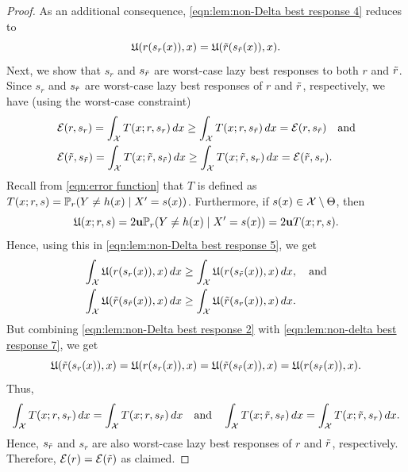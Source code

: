 \begin{proof}
    As an additional consequence, \eqref{eqn:lem:non-Delta best response 4} reduces to
    \begin{equation}\label{eqn:lem:non-delta best response 7}
        \mathfrak{U}(r(s_r(x)),x) = \mathfrak{U}(\tilde{r}(s_{\tilde{r}}(x)),x).
    \end{equation}
    Next, we show that $s_r$ and $s_{\tilde{r}}$ are worst-case lazy best responses to both $r$ and $\tilde{r}$. Since $s_r$ and $s_{\tilde{r}}$ are worst-case lazy best responses of $r$ and $\tilde{r}$, respectively, we have (using the worst-case constraint)
    \begin{equation}\label{eqn:lem:non-Delta best response 5}
        \begin{aligned}
            &\mathcal{E}(r,s_r) = \int_{\mathcal{X}} T(x;r,s_r) \, dx \geq \int_{\mathcal{X}} T(x;r,s_{\tilde{r}}) \, dx = \mathcal{E}(r,s_{\tilde{r}})\quad \text{and} \\
            &\mathcal{E}(\tilde{r},s_{\tilde{r}}) = \int_{\mathcal{X}} T(x;\tilde{r},s_{\tilde{r}}) \, dx \geq \int_{\mathcal{X}} T(x;\tilde{r},s_r) \, dx = \mathcal{E}(\tilde{r},s_r).
        \end{aligned}
    \end{equation}
    Recall from \eqref{eqn:error function} that $T$ is defined as $T(x;r,s) = \mathbb{P}_r(Y \neq h(x) \mid X'=s(x))$. Furthermore, if $s(x) \in \mathcal{X} \setminus \Theta$, then $$\mathfrak{U}(x;r,s) = 2\mathbf{u}\mathbb{P}_r(Y \neq h(x) \mid X'=s(x))  = 2\mathbf{u} T(x;r,s).$$ Hence, using this in \eqref{eqn:lem:non-Delta best response 5}, we get
    \begin{equation*}
    \begin{aligned}
        \int_{\mathcal{X}} \mathfrak{U}(r(s_r(x)),x) \, dx &\geq \int_{\mathcal{X}} \mathfrak{U}(r(s_{\tilde{r}}(x)),x) \, dx, \quad \text{and} \\
        \int_{\mathcal{X}} \mathfrak{U}(\tilde{r}(s_{\tilde{r}}(x)),x) \, dx &\geq \int_{\mathcal{X}} \mathfrak{U}(\tilde{r}(s_r(x)),x) \, dx.
    \end{aligned}
    \end{equation*}
    But combining \eqref{eqn:lem:non-Delta best response 2} with \eqref{eqn:lem:non-delta best response 7}, we get
    \[
    \mathfrak{U}(\tilde{r}(s_r(x)),x) = \mathfrak{U}(r(s_r(x)),x) = \mathfrak{U}(\tilde{r}(s_{\tilde{r}}(x)),x) = \mathfrak{U}(r(s_{\tilde{r}}(x)),x).
    \]
    Thus,
    \begin{equation*}\label{eqn:lem:non-Delta best response 8}
        \int_{\mathcal{X}} T(x;r,s_r) \, dx = \int_{\mathcal{X}} T(x;r,s_{\tilde{r}}) \, dx \quad \text{and} \quad \int_{\mathcal{X}} T(x;\tilde{r},s_{\tilde{r}}) \, dx = \int_{\mathcal{X}} T(x;\tilde{r},s_r) \, dx.
    \end{equation*}
    Hence, $s_{\tilde{r}}$ and $s_r$ are also worst-case lazy best responses of $r$ and $\tilde{r}$, respectively. Therefore, $\mathcal{E}(r) = \mathcal{E}(\tilde{r})$ as claimed.
\end{proof}

